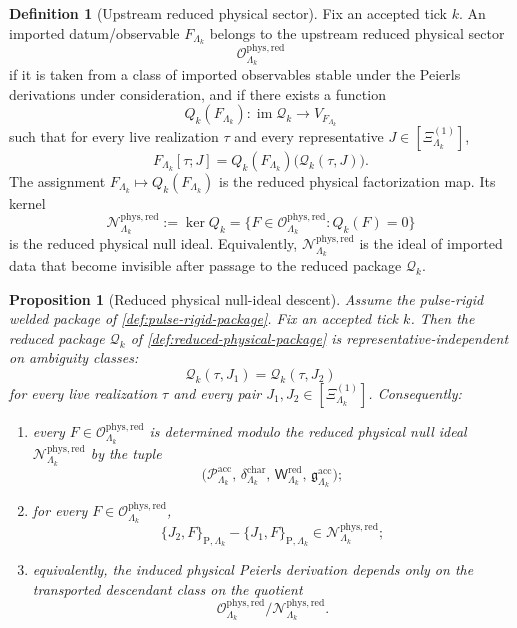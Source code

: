 \documentclass[11pt]{article}
\newtheorem{proposition}[theorem]{Proposition}
\theoremstyle{definition}
\newtheorem{definition}[theorem]{Definition}
\begin{document}
\begin{definition}[Upstream reduced physical sector]
\label{def:theorem-facing-reduced-physical-sector}
Fix an accepted tick \(k\).
An imported datum/observable \(F_{\Lambda_k}\) belongs to the upstream reduced physical sector
\[
\mathcal O^{\mathrm{phys,red}}_{\Lambda_k}
\]
if it is taken from a class of imported observables stable under the Peierls derivations under
consideration, and if there exists a function
\[
Q_k(F_{\Lambda_k})
:
\operatorname{im}\mathcal Q_k
\longrightarrow
V_{F_{\Lambda_k}}
\]
such that for every live realization \(\tau\) and every representative
\(
J\in[\Xi^{(1)}_{\Lambda_k}]
\),
\[
F_{\Lambda_k}[\tau;J]
=
Q_k(F_{\Lambda_k})\!\big(\mathcal Q_k(\tau,J)\big).
\]
The assignment \(F_{\Lambda_k}\mapsto Q_k(F_{\Lambda_k})\) is the reduced physical factorization map.
Its kernel
\[
\mathcal N^{\mathrm{phys,red}}_{\Lambda_k}
:=
\ker Q_k
=
\big\{
F\in\mathcal O^{\mathrm{phys,red}}_{\Lambda_k}
:
Q_k(F)=0
\big\}
\]
is the reduced physical null ideal.
Equivalently, \(\mathcal N^{\mathrm{phys,red}}_{\Lambda_k}\) is the ideal of imported data that
become invisible after passage to the reduced package \(\mathcal Q_k\).
\end{definition}

\begin{proposition}[Reduced physical null-ideal descent]
\label{prop:full-ambiguity-narrowed-bridge}
Assume the pulse-rigid welded package of \cref{def:pulse-rigid-package}.
Fix an accepted tick \(k\).
Then the reduced package \(\mathcal Q_k\) of \cref{def:reduced-physical-package} is
representative-independent on ambiguity classes:
\[
\mathcal Q_k(\tau,J_1)
=
\mathcal Q_k(\tau,J_2)
\]
for every live realization \(\tau\) and every pair
\(
J_1,J_2\in[\Xi^{(1)}_{\Lambda_k}]
\).
Consequently:
\begin{enumerate}[leftmargin=2em,label=(\roman*)]
\item every \(F\in\mathcal O^{\mathrm{phys,red}}_{\Lambda_k}\) is determined modulo the reduced
  physical null ideal \(\mathcal N^{\mathrm{phys,red}}_{\Lambda_k}\) by the tuple
  \[
  \Big(
  \mathcal P^{\mathrm{acc}}_{\Lambda_k},\,
  \delta^{\mathrm{char}}_{\Lambda_k},\,
  \mathsf W^{\mathrm{red}}_{\Lambda_k},\,
  \mathfrak g^{\mathrm{acc}}_{\Lambda_k}
  \Big);
  \]
\item for every \(F\in\mathcal O^{\mathrm{phys,red}}_{\Lambda_k}\),
  \[
  \{J_2,F\}_{\mathrm P,\Lambda_k}
  -
  \{J_1,F\}_{\mathrm P,\Lambda_k}
  \in
  \mathcal N^{\mathrm{phys,red}}_{\Lambda_k};
  \]
\item equivalently, the induced physical Peierls derivation depends only on the transported
  descendant class on the quotient
  \[
  \mathcal O^{\mathrm{phys,red}}_{\Lambda_k}/\mathcal N^{\mathrm{phys,red}}_{\Lambda_k}.
  \]
\end{enumerate}
\end{proposition}
\end{document}
